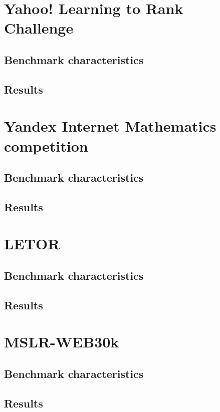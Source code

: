 \chapter{Yahoo! Learning to Rank Challenge}
\section{Benchmark characteristics}
\section{Results}
\chapter{Yandex Internet Mathematics competition}
\section{Benchmark characteristics}
\section{Results}
\chapter{LETOR}
\section{Benchmark characteristics}
\section{Results}
\chapter{MSLR-WEB30k}
\section{Benchmark characteristics}
\section{Results}